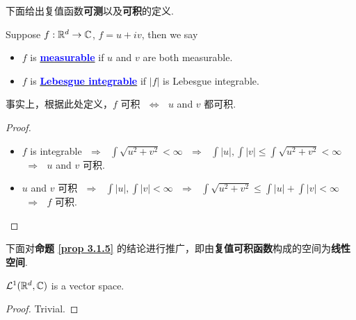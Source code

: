  	\vspace{2em}
 	下面给出复值函数\textbf{可测}以及\textbf{可积}的定义.
 	\begin{defn}\label{def 3.1.7}
 		Suppose $f : \mathbb{R}^d \rightarrow \mathbb{C}$, $f = u + iv$, then we say
 		\begin{itemize}
 			\item $f$ is \underline{\textcolor{blue}{\textbf{measurable}}} if $u$ and $v$ are both measurable.
 			
 			\item $f$ is \underline{\textcolor{blue}{\textbf{Lebesgue integrable}}} if $\left| f \right|$ is Lebesgue integrable.
 		\end{itemize}
 		
 		\vspace{2em}
 		\begin{rmk}
 			事实上，根据此处定义，$f$ 可积 $\,\, \Leftrightarrow \,\,$ $u$ and $v$ 都可积.
 			\begin{proof}
 				\begin{itemize}
 					\item $f$ is integrable $\,\, \Rightarrow \,\,$ $\int{\sqrt{u^2 + v^2}} < \infty$ $\,\, \Rightarrow \,\,$ $\int{\left| u \right|} , \int{\left| v \right|} \leq \int{\sqrt{u^2 + v^2}} < \infty$ $\,\, \Rightarrow \,\,$ $u$ and $v$ 可积.
 					
 					\item $u$ and $v$ 可积 $\,\, \Rightarrow \,\,$ $\int{\left| u \right|} , \int{\left| v \right|} < \infty$ $\,\, \Rightarrow \,\,$ $\int{\sqrt{u^2 + v^2}} \leq \int{\left| u \right|} + \int{\left| v \right|} < \infty$ $\,\, \Rightarrow \,\,$ $f$ 可积.
 				\end{itemize}
 			\end{proof}
 		\end{rmk}
 	\end{defn}
 	
 	\vspace{2em}
 	下面对\textbf{命题 \ref{prop 3.1.5}} 的结论进行推广，即由\textbf{复值可积函数}构成的空间为\textbf{线性空间}.
 	\begin{proposition}\label{prop 3.1.7}
 		$\mathcal{L}^{1}(\mathbb{R}^d , \mathbb{C})$ is a vector space.
 		
 		\vspace{2em}
 		\begin{proof}
 			Trivial.
 		\end{proof}
 	\end{proposition}
 	



	\ifx\allfiles\undefined

\fi